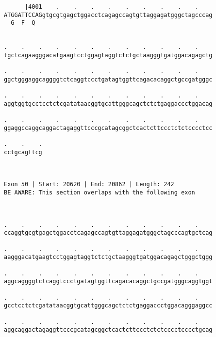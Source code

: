 \documentclass{article}
\begin{document}
\begin{Verbatim}
      |4001    .    .    .    .    .    .    .    .    .    
ATGGATTCCAGgtgcgtgagctggacctcagagccagtgttaggagatgggctagcccag
  G  F  Q                                                   
                                                            
  
.    .    .    .    .    .    .    .    .    .    .    .    
tgctcagaagggacatgaagtcctggagtaggtctctgctaagggtgatggacagagctg
                                                            
.    .    .    .    .    .    .    .    .    .    .    .    
ggctgggaggcaggggtctcaggtccctgatagtggttcagacacaggctgccgatgggc
                                                            
.    .    .    .    .    .    .    .    .    .    .    .    
aggtggtgcctcctctcgatataacggtgcattgggcagctctctgaggaccctggacag
                                                            
.    .    .    .    .    .    .    .    .    .    .    .    
ggaggccaggcaggactagaggttcccgcatagcggctcactcttccctctctcccctcc
                                                            
.    .    .
cctgcagttcg
           
           
 
Exon 50 | Start: 20620 | End: 20862 | Length: 242
BE AWARE: This section overlaps with the following exon



.    .    .    .    .    .    .    .    .    .    .    .    
ccaggtgcgtgagctggacctcagagccagtgttaggagatgggctagcccagtgctcag
                                                            
.    .    .    .    .    .    .    .    .    .    .    .    
aagggacatgaagtcctggagtaggtctctgctaagggtgatggacagagctgggctggg
                                                            
.    .    .    .    .    .    .    .    .    .    .    .    
aggcaggggtctcaggtccctgatagtggttcagacacaggctgccgatgggcaggtggt
                                                            
.    .    .    .    .    .    .    .    .    .    .    .    
gcctcctctcgatataacggtgcattgggcagctctctgaggaccctggacagggaggcc
                                                            
.    .    .    .    .    .    .    .    .    .    .    .    
aggcaggactagaggttcccgcatagcggctcactcttccctctctcccctcccctgcag
                                                            

\end{Verbatim}
\end{document}
